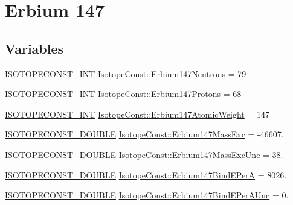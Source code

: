 \hypertarget{group___isotope_const-_erbium-_er147}{}\section{Erbium 147}
\label{group___isotope_const-_erbium-_er147}
\subsection*{Variables}
\begin{DoxyCompactItemize}
\item 
\mbox{\hyperlink{group___isotope_const-_macros_ga5f18360b3e99483a35c32d789e62621c}{I\+S\+O\+T\+O\+P\+E\+C\+O\+N\+S\+T\+\_\+\+I\+NT}} \mbox{\hyperlink{group___isotope_const-_erbium-_er147_gacda56a3b7029c0113ea40668590cd932}{Isotope\+Const\+::\+Erbium147\+Neutrons}} = 79
\item 
\mbox{\hyperlink{group___isotope_const-_macros_ga5f18360b3e99483a35c32d789e62621c}{I\+S\+O\+T\+O\+P\+E\+C\+O\+N\+S\+T\+\_\+\+I\+NT}} \mbox{\hyperlink{group___isotope_const-_erbium-_er147_ga8cf897c97cc0f5350ed4a29176633efb}{Isotope\+Const\+::\+Erbium147\+Protons}} = 68
\item 
\mbox{\hyperlink{group___isotope_const-_macros_ga5f18360b3e99483a35c32d789e62621c}{I\+S\+O\+T\+O\+P\+E\+C\+O\+N\+S\+T\+\_\+\+I\+NT}} \mbox{\hyperlink{group___isotope_const-_erbium-_er147_ga8aad24d3dfed998133d4e0a79999360c}{Isotope\+Const\+::\+Erbium147\+Atomic\+Weight}} = 147
\item 
\mbox{\hyperlink{group___isotope_const-_macros_ga8f45a7272ce02c0b4c65c44636ed719a}{I\+S\+O\+T\+O\+P\+E\+C\+O\+N\+S\+T\+\_\+\+D\+O\+U\+B\+LE}} \mbox{\hyperlink{group___isotope_const-_erbium-_er147_ga8ed08793e55fecfb167f92b6ec41c962}{Isotope\+Const\+::\+Erbium147\+Mass\+Exc}} = -\/46607.
\item 
\mbox{\hyperlink{group___isotope_const-_macros_ga8f45a7272ce02c0b4c65c44636ed719a}{I\+S\+O\+T\+O\+P\+E\+C\+O\+N\+S\+T\+\_\+\+D\+O\+U\+B\+LE}} \mbox{\hyperlink{group___isotope_const-_erbium-_er147_gaf6100b5a9d361a8a17862cdd8bc641ba}{Isotope\+Const\+::\+Erbium147\+Mass\+Exc\+Unc}} = 38.
\item 
\mbox{\hyperlink{group___isotope_const-_macros_ga8f45a7272ce02c0b4c65c44636ed719a}{I\+S\+O\+T\+O\+P\+E\+C\+O\+N\+S\+T\+\_\+\+D\+O\+U\+B\+LE}} \mbox{\hyperlink{group___isotope_const-_erbium-_er147_gaaabc9afac0393ef5250c950afb202d46}{Isotope\+Const\+::\+Erbium147\+Bind\+E\+PerA}} = 8026.
\item 
\mbox{\hyperlink{group___isotope_const-_macros_ga8f45a7272ce02c0b4c65c44636ed719a}{I\+S\+O\+T\+O\+P\+E\+C\+O\+N\+S\+T\+\_\+\+D\+O\+U\+B\+LE}} \mbox{\hyperlink{group___isotope_const-_erbium-_er147_ga036d0bae55e6a5c8eb222f361f6c50a3}{Isotope\+Const\+::\+Erbium147\+Bind\+E\+Per\+A\+Unc}} = 0.

\end{DoxyCompactItemize}
